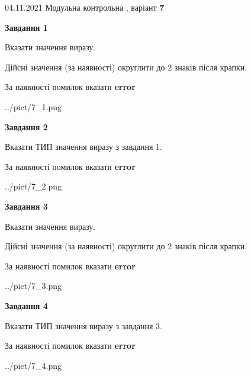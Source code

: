 \documentclass[11pt, ukrainian]{article}
\begin{document}
{04.11.2021 Модульна контрольна , варіант  \No \textbf { 7 }\par}
{
\begin {large}
{\begin {center}\textbf{Завдання 1}\end {center}}\par
Вказати значення виразу. \par
Дійсні значення (за наявності) округлити до 2 знаків після крапки. \par
За наявності помилок вказати \textbf{error}

\begin{center}
	{../pict/7_1.png}
\end{center}
\newpage

{\begin {center}\textbf{Завдання 2}\end {center}}\par
Вказати ТИП значення виразу з завдання 1. \par
За наявності помилок вказати \textbf{error}

\begin{center}
	{../pict/7_2.png}
\end{center}
\newpage

{\begin {center}\textbf{Завдання 3}\end {center}}\par
Вказати значення виразу. \par
Дійсні значення (за наявності) округлити до 2 знаків після крапки. \par
За наявності помилок вказати \textbf{error}

\begin{center}
	{../pict/7_3.png}
\end{center}
\newpage

{\begin {center}\textbf{Завдання 4}\end {center}}\par
Вказати ТИП значення виразу з завдання 3. \par
За наявності помилок вказати \textbf{error}

\begin{center}
	{../pict/7_4.png}
\end{center}
\newpage


\end{large}}
\end{document}
